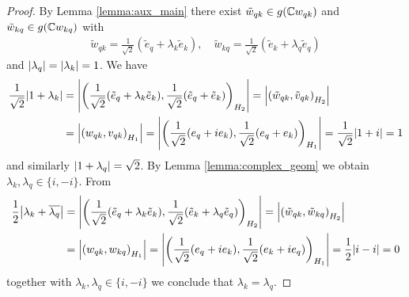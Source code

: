 \begin{proof}
	
	By Lemma \ref{lemma:aux_main} there exist $\tilde{w}_{qk} \in g(\mathbb{C} w_{qk})$ and $\tilde{w}_{kq} \in g(\mathbb{C} w_{kq})$ with
	\begin{align*}
		\tilde{w}_{qk} = \frac{1}{\sqrt{2}}(\tilde{e}_q + \lambda_k \tilde{e}_k), \quad \tilde{w}_{kq} = \frac{1}{\sqrt{2}}(\tilde{e}_k + \lambda_q \tilde{e}_q)
	\end{align*}
	and ${\left | \lambda_q \right |} = {\left | \lambda_k \right |} = 1$. We have
	\begin{align*}
		\frac{1}{\sqrt{2}}{\left | 1 + \lambda_k \right |} &= {\left | {\left ( \frac{1}{\sqrt{2}}(\tilde{e}_q + \lambda_k \tilde{e}_k), \frac{1}{\sqrt{2}} (\tilde{e}_q + \tilde{e}_k) \right )}_{H_2} \right |} = {\left | {\left ( \tilde{w}_{qk}, \tilde{v}_{qk} \right )}_{H_2} \right |} \\
		&= {\left | {\left ( w_{qk}, v_{qk} \right )}_{H_1} \right |} = {\left | {\left ( \frac{1}{\sqrt{2}}(e_q + ie_k), \frac{1}{\sqrt{2}} (e_q + e_k) \right )}_{H_1} \right |} = \frac{1}{\sqrt{2}} {\left | 1 + i \right |} = 1
	\end{align*}
	and similarly ${\left | 1 + \lambda_q \right |} = \sqrt{2}$. By Lemma \ref{lemma:complex_geom} we obtain $\lambda_k, \lambda_q \in \{i, -i\}$. From
	\begin{align*}
		\frac{1}{2}{\left | \lambda_k + \overline{\lambda_q} \right |} &= {\left | {\left ( \frac{1}{\sqrt{2}}(\tilde{e}_q + \lambda_k \tilde{e}_k), \frac{1}{\sqrt{2}}(\tilde{e}_k + \lambda_{q} \tilde{e}_q) \right )}_{H_2} \right |} = {\left | {\left ( \tilde{w}_{qk}, \tilde{w}_{kq} \right )}_{H_2} \right |} \\
		&= {\left | {\left ( w_{qk}, w_{kq} \right )}_{H_1} \right |} = {\left | {\left ( \frac{1}{\sqrt{2}}(e_q + i e_k), \frac{1}{\sqrt{2}}(e_k + i e_q) \right )}_{H_1} \right |} = \frac{1}{2}{\left | i - i \right |} = 0
	\end{align*}
	together with $\lambda_k, \lambda_q \in \{i, -i\}$ we conclude that $\lambda_k = \lambda_q$.
\end{proof}



